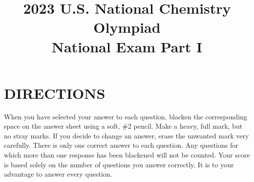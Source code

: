 \documentclass[twocolumn,10pt]{article}
\title{2023 U.S. National Chemistry Olympiad\\National Exam Part I}
\date{}
\author{}
\begin{document}
\maketitle

\section*{DIRECTIONS}
When you have selected your answer to each question, blacken the corresponding space on the answer sheet using a soft, \#2 pencil. Make a heavy, full mark, but no stray marks. If you decide to change an answer, erase the unwanted mark very carefully. There is only one correct answer to each question. Any questions for which more than one response has been blackened will not be counted. Your score is based solely on the number of questions you answer correctly. It is to your advantage to answer every question.
\end{document}
